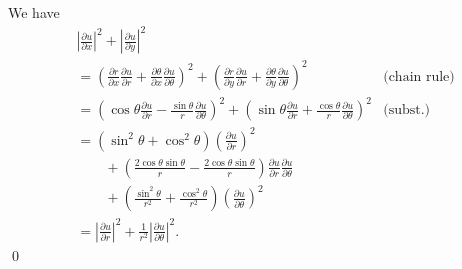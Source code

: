 \documentclass[oneside]{article}
\newcommand\abs[1]{\left|#1\right|}
\begin{document}
We have\begin{align*}
&\abs{\frac{\partial u}{\partial x}}^2 + \abs{\frac{\partial u}{\partial y}}^2 \\
&= \left(
    \frac{\partial r}{\partial x}\frac{\partial u}{\partial r}
    + \frac{\partial\theta}{\partial x}\frac{\partial u}{\partial\theta}
  \right)^2 + \left(
    \frac{\partial r}{\partial y}\frac{\partial u}{\partial r}
    + \frac{\partial\theta}{\partial y}\frac{\partial u}{\partial\theta}
  \right)^2 &\text{(chain rule)}\\
&= \left(
    \cos\theta\frac{\partial u}{\partial r}
    -\frac{\sin\theta}{r}\frac{\partial u}{\partial\theta}
  \right)^2 + \left(
    \sin\theta\frac{\partial u}{\partial r}
    + \frac{\cos\theta}{r}\frac{\partial u}{\partial\theta}
  \right)^2 &\text{(subst.)}\\
&= \left(\sin^2\theta + \cos^2\theta\right)
   \left(\frac{\partial u}{\partial r}\right)^2 \\
 &\qquad+ \left(\frac{2\cos\theta\sin\theta}{r}
                - \frac{2\cos\theta\sin\theta}{r}\right)
   \frac{\partial u}{\partial r}\frac{\partial u}{\partial\theta} \\
 &\qquad+ \left(\frac{\sin^2\theta}{r^2} + \frac{\cos^2\theta}{r^2}\right)
   \left(\frac{\partial u}{\partial\theta}\right)^2 \\
&= \abs{\frac{\partial u}{\partial r}}^2
  + \frac{1}{r^2}\abs{\frac{\partial u}{\partial\theta}}^2 \text{.}
\end{align*} \qed
\end{document}
